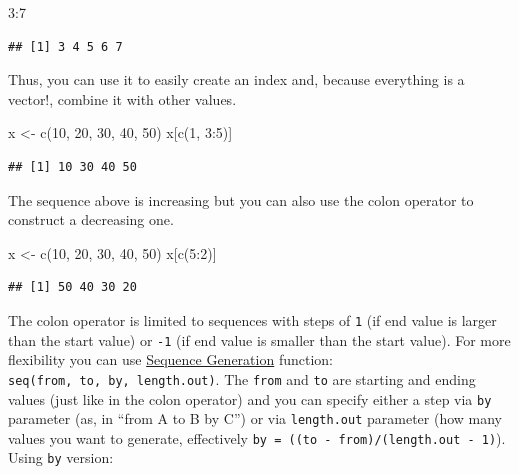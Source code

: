 \documentclass[
]{book}
\newenvironment{Shaded}{\begin{snugshade}}{\end{snugshade}}
\newcommand{\DecValTok}[1]{\textcolor[rgb]{0.00,0.00,0.81}{#1}}
\newcommand{\FunctionTok}[1]{\textcolor[rgb]{0.00,0.00,0.00}{#1}}
\newcommand{\NormalTok}[1]{#1}
\newcommand{\OtherTok}[1]{\textcolor[rgb]{0.56,0.35,0.01}{#1}}
\newcommand{\SpecialCharTok}[1]{\textcolor[rgb]{0.00,0.00,0.00}{#1}}
\begin{document}
\begin{Shaded}
\begin{Highlighting}[]
\DecValTok{3}\SpecialCharTok{:}\DecValTok{7}
\end{Highlighting}
\end{Shaded}

\begin{verbatim}
## [1] 3 4 5 6 7
\end{verbatim}

Thus, you can use it to easily create an index and, because everything is a vector!, combine it with other values.

\begin{Shaded}
\begin{Highlighting}[]
\NormalTok{x }\OtherTok{\textless{}{-}} \FunctionTok{c}\NormalTok{(}\DecValTok{10}\NormalTok{, }\DecValTok{20}\NormalTok{, }\DecValTok{30}\NormalTok{, }\DecValTok{40}\NormalTok{, }\DecValTok{50}\NormalTok{)}
\NormalTok{x[}\FunctionTok{c}\NormalTok{(}\DecValTok{1}\NormalTok{, }\DecValTok{3}\SpecialCharTok{:}\DecValTok{5}\NormalTok{)]}
\end{Highlighting}
\end{Shaded}

\begin{verbatim}
## [1] 10 30 40 50
\end{verbatim}

The sequence above is increasing but you can also use the colon operator to construct a decreasing one.

\begin{Shaded}
\begin{Highlighting}[]
\NormalTok{x }\OtherTok{\textless{}{-}} \FunctionTok{c}\NormalTok{(}\DecValTok{10}\NormalTok{, }\DecValTok{20}\NormalTok{, }\DecValTok{30}\NormalTok{, }\DecValTok{40}\NormalTok{, }\DecValTok{50}\NormalTok{)}
\NormalTok{x[}\FunctionTok{c}\NormalTok{(}\DecValTok{5}\SpecialCharTok{:}\DecValTok{2}\NormalTok{)]}
\end{Highlighting}
\end{Shaded}

\begin{verbatim}
## [1] 50 40 30 20
\end{verbatim}

The colon operator is limited to sequences with steps of \texttt{1} (if end value is larger than the start value) or \texttt{-1} (if end value is smaller than the start value). For more flexibility you can use \href{https://stat.ethz.ch/R-manual/R-devel/library/base/html/seq.html}{Sequence Generation} function: \texttt{seq(from,\ to,\ by,\ length.out)}. The \texttt{from} and \texttt{to} are starting and ending values (just like in the colon operator) and you can specify either a step via \texttt{by} parameter (as, in ``from A to B by C'') or via \texttt{length.out} parameter (how many values you want to generate, effectively \texttt{by\ =\ ((to\ -\ from)/(length.out\ -\ 1)}).
Using \texttt{by} version:
\end{document}
